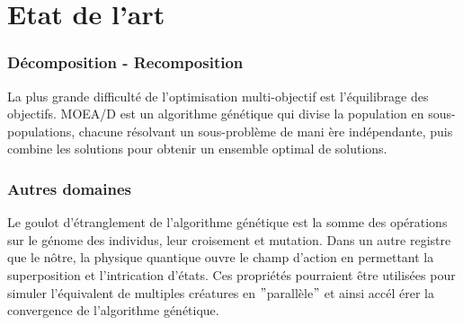 \documentclass[journal, a4paper]{IEEEtran}
\begin{document}

\section{Etat de l'art}\label{sec:etat-de-l'art}
	\subsubsection{Décomposition - Recomposition}
	La plus grande difficulté de l'optimisation multi-objectif est
	l'équilibrage des objectifs.
	MOEA/D\cite{MOEA/D} est un algorithme génétique qui divise la
	population en
	sous-populations, chacune résolvant un sous-problème de mani
	ère indépendante,
	puis combine les solutions pour obtenir un ensemble optimal de solutions.

\subsubsection{Autres domaines}
	Le goulot d'étranglement de l'algorithme génétique est la somme
	des opérations sur le génome des individus, leur croisement et
	mutation.
	Dans un autre registre que le nôtre, la physique quantique ouvre le
	champ d'action en permettant la superposition et
	l'intrication
	d'états.
	Ces propriétés pourraient être utilisées pour simuler
	l'équivalent de multiples créatures en \("\)parallèle\("\) et ainsi accél
	érer la convergence
	de l'algorithme génétique.\cite{quantum-computing}
\end{document}
